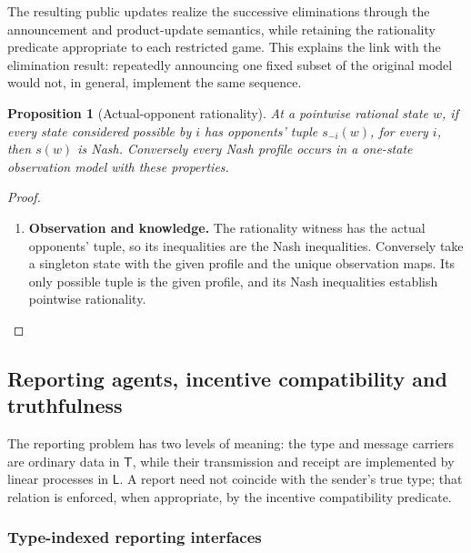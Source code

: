 \documentclass[11pt,a4paper]{article}
\numberwithin{equation}{section}
\newtheorem{proposition}[theorem]{Proposition}
\theoremstyle{definition}
\theoremstyle{remark}
\theoremstyle{plain}
\begin{document}
The resulting public updates realize the successive eliminations
through the announcement and product-update semantics, while retaining
the rationality predicate appropriate to each restricted game. This
explains the link with the elimination result: repeatedly announcing one
fixed subset of the original model would not, in general, implement the
same sequence.

\begin{proposition}[Actual-opponent rationality]
At a pointwise rational state $w$, if every state considered possible by
$i$ has opponents' tuple $s_{-i}(w)$, for every $i$, then $s(w)$ is Nash.
Conversely every Nash profile occurs in a one-state observation model with
these properties.
\end{proposition}
\begin{proof}
\leavevmode
\begin{enumerate}[label=\textup{(\arabic*)},leftmargin=*,itemsep=4pt,topsep=3pt]
  \item \textbf{Observation and knowledge.} The rationality witness has the actual opponents' tuple, so its inequalities
are the Nash inequalities. Conversely take a singleton state with the given
profile and the unique observation maps. Its only possible tuple is the
given profile, and its Nash inequalities establish pointwise rationality.
\end{enumerate}
\end{proof}

\subsection{Reporting agents, incentive compatibility and truthfulness}
\label{sec:egt-reporting}

The reporting problem has two levels of meaning: the type and
message carriers are ordinary data in $\mathsf T$, while their
transmission and receipt are implemented by linear processes in
$\mathsf L$. A report need not coincide with the sender's true type;
that relation is enforced, when appropriate, by the incentive
compatibility predicate.

\subsubsection{Type-indexed reporting interfaces}
\end{document}
